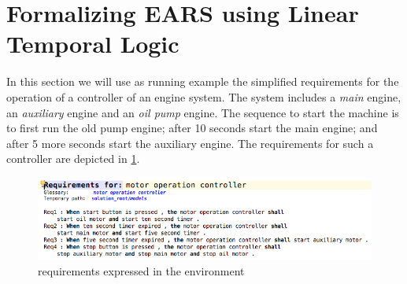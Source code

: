 \section{Formalizing EARS using Linear Temporal Logic}
\label{sec:formalization}

In this section we will use as running example the simplified requirements for
the operation of a controller of an engine system. The system includes a
\emph{main} engine, an \emph{auxiliary} engine and an \emph{oil pump} engine.
The sequence to start the machine is to first run the old pump engine; after 10 seconds start
the main engine; and after 5 more seconds start the auxiliary engine.
The \ears requirements for such a controller are depicted in
\fig\ref{fig:reqs_motor}.

\begin{figure}[!h]
\centering
\includegraphics[width=.5\textwidth]{figures/motor_ears}
\caption{\ears requirements expressed in the \earsctrl environment}
\label{fig:reqs_motor}
\end{figure}

